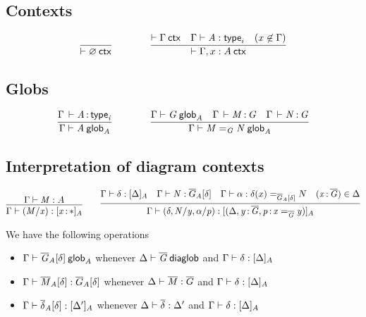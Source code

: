 \subsection{Contexts}

\begin{small}
  \[
  \infer{\wfctx{\varnothing}}{}
  \qquad\qquad
  \infer{\wfctx{\Gamma,x:A}}
  {\wfctx{\Gamma}
    & \wftype{\Gamma}{A}
    & (x\not\in\Gamma)}
  \]
\end{small}



\subsection{Globs}

\begin{small}
  \[
  \infer{\wfglob{\Gamma}{A}{0}{A}}
  {\oftp{\Gamma}{A}{\typ{i}}}
  \qquad\qquad
  \infer{\wfglob{\Gamma}{\homj{G}{M}{N}}{n+1}{A}}
  {\wfglob{\Gamma}{G}{n}{A} &
    \oftp{\Gamma}{M}{G} &
    \oftp{\Gamma}{N}{G}
  }
  \]
\end{small}

\subsection{Interpretation of diagram contexts}

\begin{small}
  \[\infer{\ofinterp{\Gamma}{(M/x)}{\tptm{x}{\diagbase}}{A}}
  {\ofglob{\Gamma}{M}{A}}
  \qquad
  \infer{\ofinterp{\Gamma}{(\delta,N/y, \alpha/p)}
    {(\Delta,\tptm{y}{\diag G},\tptm{p}{\homj{\diag{G}}{x}{y}})}{A}}
  {\ofinterp{\Gamma}{\delta}{\Delta}{A}
    & \ofglob{\Gamma}{N}{\interpglob{\diag G}{A}{\delta}}
    & \ofdiaglob{\Gamma}{\alpha}{
      \homj{\interpglob{\diag G}{A}{\delta}}{\delta(x)}{N}}
    & (\tptm{x}{\diag G})\in\Delta}
\]
\end{small}

We have the following operations
\begin{itemize}
\item $\text{\ensuremath{\Gamma}} \vdash \mathit{{\overline{G}}_{A}[{\delta}]} \: \mathsf{glob}_{\mathit{A}}$ whenever
  $\text{\ensuremath{\Delta}} \vdash \mathit{\overline{G}} \: \mathsf{diaglob}$ and $\text{\ensuremath{\Gamma}} \vdash \mathit{\delta} : {[ \Delta ]_{A}}$
\item $\text{\ensuremath{\Gamma}} \vdash \mathit{{\overline{M}}_{A}[{\delta}]} : {} {{\overline{G}}_{A}[{\delta}]}$ whenever $\text{\ensuremath{\Delta}} \vdash \mathit{\overline{M}} : {\overline{G}}$ and
  $\text{\ensuremath{\Gamma}} \vdash \mathit{\delta} : {[ \Delta ]_{A}}$
\item $\text{\ensuremath{\Gamma}} \vdash \mathit{{\overline{\delta}}_{A}[{\delta}]} : {[ \Delta' ]_{A}}$
  whenever $\text{\ensuremath{\Delta}} \vdash \mathit{\overline{\delta}} : {\Delta'}$ and
  $\text{\ensuremath{\Gamma}} \vdash \mathit{\delta} : {[ \Delta ]_{A}}$
\end{itemize}

